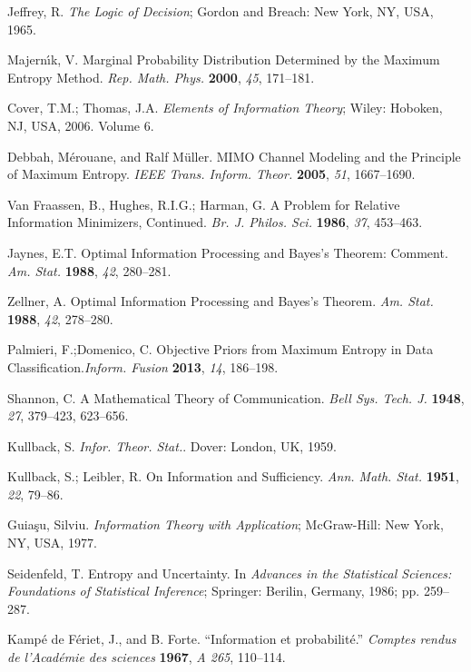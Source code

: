 \documentclass[entropy,article,accept,oneauthor,pdftex,12pt,a4paper]{mdpi}
\begin{document}
\begin{thebibliography}{----}

 Jeffrey, R. \emph{The Logic of Decision}; Gordon and Breach: New York, NY, USA, 1965.

 Majern{\'\i}k, V. Marginal Probability Distribution Determined by the Maximum Entropy Method. \emph{Rep. Math. Phys.} {\bf2000}, \emph{45},   171--181.

Cover, T.M.; Thomas, J.A.  \emph{Elements of Information Theory}; Wiley: Hoboken, NJ, USA, 2006. Volume 6.

 Debbah, M{\'e}rouane, and Ralf M{\"u}ller. MIMO Channel Modeling and the Principle of Maximum Entropy. \emph{IEEE Trans. Inform. Theor.} {\bf 2005}, \emph{51}, 1667--1690.

 Van Fraassen, B., Hughes, R.I.G.; Harman, G. A Problem for Relative Information Minimizers, Continued. \emph{Br. J. Philos. Sci.} {\bf1986},  \emph{37}, 453--463.

 Jaynes, E.T. Optimal Information Processing and Bayes's Theorem: Comment. \emph{Am. Stat.} {\bf1988}, \emph{42}, 280--281.

 Zellner, A. Optimal Information Processing and Bayes's Theorem. \emph{Am. Stat.} {\bf1988}, \emph{42}, 278--280.

 Palmieri, F.;Domenico, C. Objective Priors from Maximum Entropy in Data Classification.\emph{Inform. Fusion}  {\bf2013}, \emph{14}, 186--198.

 Shannon, C. A Mathematical Theory of Communication. \emph{Bell Sys. Tech. J.} {\bf1948}, \emph{27}, 379--423, 623--656.

 Kullback, S. \emph{Infor. Theor. Stat.}. Dover: London, UK, 1959.

 Kullback, S.;  Leibler, R. On Information and Sufficiency. \emph{Ann. Math. Stat.} {\bf1951}, \emph{22}, 79--86.

 Guia{\c{s}}u, Silviu. \emph{Information Theory with Application}; McGraw-Hill: New York, NY, USA, 1977. 

 Seidenfeld, T. Entropy and Uncertainty. In \emph{Advances in the Statistical Sciences: Foundations of Statistical Inference}; Springer: Berilin, Germany, 1986; pp. 259--287.

 Kamp{\'e} de F{\'e}riet, J., and B. Forte. ``Information et probabilit{\'e}.'' \emph{Comptes rendus de l'Acad{\'e}mie des sciences} {\bf1967}, \emph{A 265}, 110--114.


\end{thebibliography}
\end{document}
